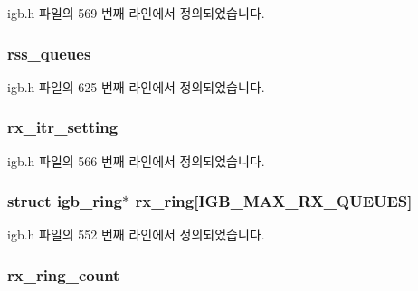 igb.\+h 파일의 569 번째 라인에서 정의되었습니다.

\subsubsection[{\texorpdfstring{rss\+\_\+queues}{rss_queues}}]{ rss\+\_\+queues}\hypertarget{structigb__adapter_a1c0a0a414a9247a24714575a6c93f9b0}{}\label{structigb__adapter_a1c0a0a414a9247a24714575a6c93f9b0}


igb.\+h 파일의 625 번째 라인에서 정의되었습니다.

\subsubsection[{\texorpdfstring{rx\+\_\+itr\+\_\+setting}{rx_itr_setting}}]{ rx\+\_\+itr\+\_\+setting}\hypertarget{structigb__adapter_aebbc3c2e6199ad30f4dacdf1446543a4}{}\label{structigb__adapter_aebbc3c2e6199ad30f4dacdf1446543a4}


igb.\+h 파일의 566 번째 라인에서 정의되었습니다.

\subsubsection[{\texorpdfstring{rx\+\_\+ring}{rx_ring}}]{\setlength{\rightskip}{0pt plus 5cm}struct {\bf igb\+\_\+ring}$\ast$ {\bf rx\+\_\+ring}\mbox{[}{\bf I\+G\+B\+\_\+\+M\+A\+X\+\_\+\+R\+X\+\_\+\+Q\+U\+E\+U\+ES}\mbox{]}}\hypertarget{structigb__adapter_aba41465c4e7dcc3ba920c19a2d732ed5}{}\label{structigb__adapter_aba41465c4e7dcc3ba920c19a2d732ed5}


igb.\+h 파일의 552 번째 라인에서 정의되었습니다.

\subsubsection[{\texorpdfstring{rx\+\_\+ring\+\_\+count}{rx_ring_count}}]{ rx\+\_\+ring\+\_\+count}\hypertarget{structigb__adapter_a8cbee0f507afaaabb0f916510c26be42}{}\label{structigb__adapter_a8cbee0f507afaaabb0f916510c26be42}


